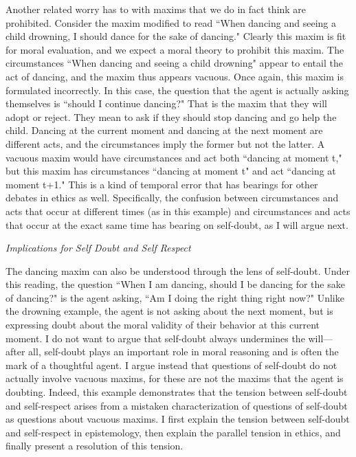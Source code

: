 \begin{isabellebody}
\begin{isamarkuptext}
Another related worry has to with maxims that we do in fact think are prohibited. Consider the maxim modified to 
read ``When dancing and seeing a child drowning, I should dance for the sake of dancing." Clearly this 
maxim is fit for moral evaluation, and we expect a moral theory to prohibit this maxim. The circumstances 
``When dancing and seeing a child drowning" appear to entail the act of dancing, and the maxim thus 
appears vacuous. Once again, this maxim is formulated incorrectly. In this case, the question 
that the agent is actually asking themselves is ``should I continue dancing?" That is the 
maxim that they will adopt or reject. They mean to ask if they should stop dancing and go help the child. 
Dancing at the current moment and dancing at the next moment are different acts, and the circumstances 
imply the former but not the latter. A vacuous maxim would have circumstances and act both 
``dancing at moment t," but this maxim has circumstances ``dancing at moment t" and act ``dancing 
at moment t+1." This is a kind of temporal error that has bearings for other debates in ethics as well. 
Specifically, the confusion between circumstances and acts that occur at different times (as in this example) and circumstances 
and acts that occur at the exact same time has bearing on self-doubt, as I will argue next.

\emph{Implications for Self Doubt and Self Respect}

The dancing maxim can also be understood through the lens of self-doubt. Under this 
reading, the question ``When I am dancing, 
should I be dancing for the sake of dancing?" is the agent asking, ``Am I doing the right thing 
right now?" Unlike the drowning example, the agent is not asking about the next moment, but is expressing doubt about the 
moral validity of their behavior at this current moment. I do not want to argue that self-doubt always
 undermines the will—after all, self-doubt plays an important role in moral 
reasoning and is often the mark of a thoughtful agent. I argue instead that questions of self-doubt
do not actually involve vacuous maxims, for these are not the maxims that the agent is doubting. Indeed,
this example demonstrates that the tension between self-doubt and self-respect arises from a 
mistaken characterization of questions of self-doubt as questions about vacuous maxims.
I first explain the tension between self-doubt and self-respect in epistemology, then 
explain the parallel tension in ethics, and finally present a resolution of this tension.


\end{isamarkuptext}
\end{isabellebody}

